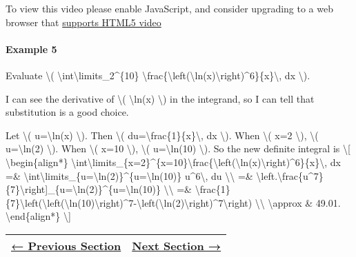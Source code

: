 To view this video please enable JavaScript, and consider upgrading to a
web browser that \href{http://videojs.com/html5-video-support/}{supports
HTML5 video}

\hypertarget{example-5}{%
\paragraph{Example 5}\label{example-5}}

Evaluate \textbackslash{}(
\textbackslash{}int\textbackslash{}limits\_2\^{}\{10\}
\textbackslash{}frac\{\textbackslash{}left(\textbackslash{}ln(x)\textbackslash{}right)\^{}6\}\{x\}\textbackslash{},
dx \textbackslash{}).

I can see the derivative of \textbackslash{}( \textbackslash{}ln(x)
\textbackslash{}) in the integrand, so I can tell that substitution is a
good choice.

Let \textbackslash{}( u=\textbackslash{}ln(x) \textbackslash{}). Then
\textbackslash{}( du=\textbackslash{}frac\{1\}\{x\}\textbackslash{}, dx
\textbackslash{}). When \textbackslash{}( x=2 \textbackslash{}),
\textbackslash{}( u=\textbackslash{}ln(2) \textbackslash{}). When
\textbackslash{}( x=10 \textbackslash{}), \textbackslash{}(
u=\textbackslash{}ln(10) \textbackslash{}). So the new definite integral
is \textbackslash{}{[} \textbackslash{}begin\{align*\}
\textbackslash{}int\textbackslash{}limits\_\{x=2\}\^{}\{x=10\}\textbackslash{}frac\{\textbackslash{}left(\textbackslash{}ln(x)\textbackslash{}right)\^{}6\}\{x\}\textbackslash{},
dx =\&
\textbackslash{}int\textbackslash{}limits\_\{u=\textbackslash{}ln(2)\}\^{}\{u=\textbackslash{}ln(10)\}
u\^{}6\textbackslash{}, du \textbackslash{}\textbackslash{} =\&
\textbackslash{}left.\textbackslash{}frac\{u\^{}7\}\{7\}\textbackslash{}right{]}\_\{u=\textbackslash{}ln(2)\}\^{}\{u=\textbackslash{}ln(10)\}
\textbackslash{}\textbackslash{} =\&
\textbackslash{}frac\{1\}\{7\}\textbackslash{}left(\textbackslash{}left(\textbackslash{}ln(10)\textbackslash{}right)\^{}7-\textbackslash{}left(\textbackslash{}ln(2)\textbackslash{}right)\^{}7\textbackslash{}right)
\textbackslash{}\textbackslash{} \textbackslash{}approx \& 49.01.
\textbackslash{}end\{align*\} \textbackslash{}{]}

\begin{longtable}[]{@{}ll@{}}
\toprule
\endhead
\href{section3-3.php}{← Previous Section} & \href{section3-5.php}{Next
Section →}\tabularnewline
\bottomrule
\end{longtable}
